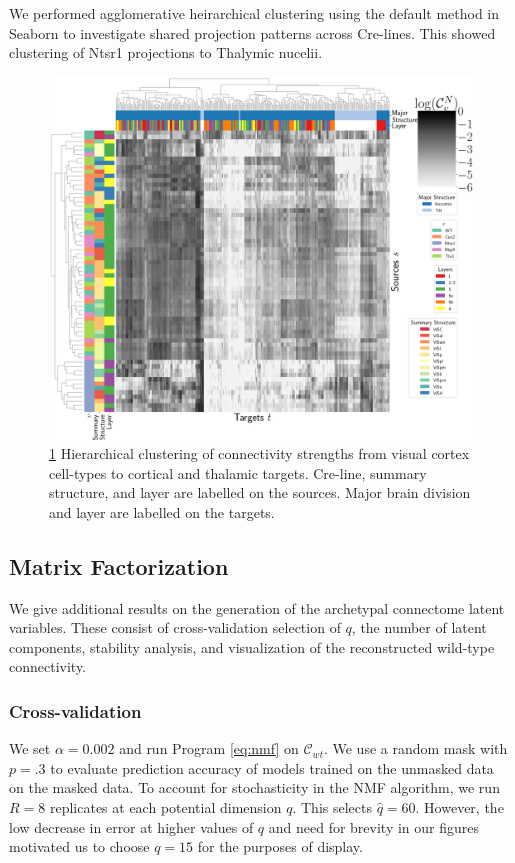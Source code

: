 We performed agglomerative heirarchical clustering using the default method in Seaborn \citep{Waskom2021} to investigate shared projection patterns across Cre-lines.
This showed clustering of Ntsr1 projections to Thalymic nucelii.

\begin{figure}
 \label{fig:ct_clust}
    \includegraphics[width=.6\textwidth]{figs/heirarchical.png}
\caption{  \ref{fig:ct_clust}
		Hierarchical clustering of connectivity strengths from visual cortex cell-types to cortical and thalamic targets.
		Cre-line, summary structure, and layer are labelled on the sources.
		Major brain division and layer are labelled on the targets.}
  \end{figure}
  
  
 \newpage
    
\subsection{Matrix Factorization}
\label{supp_sec:matrix_factor_results}

We give additional results on the generation of the archetypal connectome latent variables.
These consist of cross-validation selection of $q$, the number of latent components, stability analysis, and visualization of the reconstructed wild-type connectivity.

\subsubsection{Cross-validation}

We set $\alpha = 0.002$ and run Program \ref{eq:nmf} on $\mathcal C_{wt}$.
We use a random mask with $p = .3$ to evaluate prediction accuracy of models trained on the unmasked data on the masked data.
To account for stochasticity in the NMF algorithm, we run $R = 8$ replicates at each potential dimension $q$.
This selects $\hat q = 60$.
However, the low decrease in error at higher values of $q$ and need for brevity in our figures motivated us to choose $q=15$ for the purposes of display.

